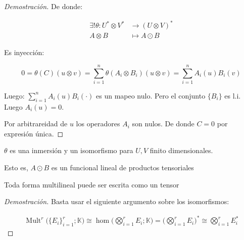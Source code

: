 \begin{proof}[Demostración]
	De donde:
	
	\begin{align*}
		\exists !\theta :  U^*\otimes V^* &\to (U \otimes V)^* \\
		A\otimes B &\mapsto A\odot B
	\end{align*}
	
	Es inyección: 
	
	\begin{equation*}
		0 = \theta (C)(u\otimes v) = \sum_{i = 1}^n \theta (A_i\otimes B_i) (u \otimes v)=  \sum_{i = 1}^n A_i(u) B_i(v)
	\end{equation*}
	
	Luego: $\sum_{i = 1}^n A_i(u) B_i(\cdot)$ es un mapeo nulo. Pero el conjunto $\{B_i\}$ es l.i. Luego $A_i (u) = 0$.
	
	Por arbitrareidad de $u$ los operadores $A_i$ son nulos. De donde $C = 0$ por expresión única.
\end{proof}

\begin{cor}
	$\theta$ es una inmersión y un isomorfismo para $U,V$ finito dimensionales.
	
	Esto es, $A\odot B$ es un funcional lineal de productos tensoriales
\end{cor}

\begin{thm}
	Toda forma multilineal puede ser escrita como un tensor
\end{thm}

\begin{proof}[Demostración]
	Basta usar el siguiente argumento sobre los isomorfismos:
	
	\begin{align*}
		\operatorname{Mult}^r \bigg(\{E_i\}_{i = 1}^r; \mathbb{K}\bigg) \cong\hom \bigg(\bigotimes_{i =1}^r E_i; \mathbb{K}\bigg) = \bigg(\bigotimes_{i =1}^r E_i\bigg)^* \cong \bigotimes_{i =1}^r E_i^*
	\end{align*}
\end{proof}

